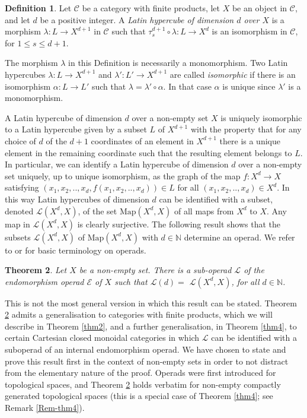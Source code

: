 \documentclass{amsart} %
\theoremstyle{plain}\newtheorem{Theorem}{Theorem}[section]
\theoremstyle{plain}\newtheorem{Conjecture}[Theorem]{Conjecture}
\theoremstyle{plain}\newtheorem{Corollary}[Theorem]{Corollary}
\theoremstyle{plain}\newtheorem{Lemma}[Theorem]{Lemma}
\theoremstyle{plain}\newtheorem{Proposition}[Theorem]{Proposition}
\theoremstyle{definition}\newtheorem{Definition}[Theorem]{Definition}
\theoremstyle{definition}\newtheorem{Example}[Theorem]{Example}
\theoremstyle{definition}\newtheorem{Examples}[Theorem]{Examples}
\theoremstyle{definition}\newtheorem{Remark}[Theorem]{Remark}
\theoremstyle{definition}\newtheorem{Remarks}[Theorem]{Remarks}
\theoremstyle{plain}\newtheorem{Statement}[Theorem]{}
\def\CC{{\mathcal{C}}}    \def\OP{{\mathcal{O}P}}
\def\CE{{\mathcal{E}}}    \def\OR{{\mathcal{O}R}}
\def\CL{{\mathcal{L}}}  \def\bCL{{\mathbf{L}}}
\def\N{{\mathbb N}}
\def\Map{\mathrm{Map}}
\begin{document}
\begin{Definition} \label{hypercubeDef}
Let $\CC$ be a category with finite products,  let $X$ be an object in $\CC$, and let $d$ be 
a positive integer.
A {\em Latin hypercube of dimension $d$ over $X$} is a morphism $\lambda : L \to X^{d+1}$
in $\CC$ such that $\tau^{d+1}_s\circ \lambda : L \to X^d$ is an isomorphism
in $\CC$, for $1\leq s\leq d+1$.
\end{Definition} 

The morphism $\lambda$ in this Definition is necessarily a monomorphism. 
Two Latin hypercubes $\lambda : L\to X^{d+1}$ and $\lambda' : L'\to X^{d+1}$ 
are called {\em isomorphic} if there is an isomorphism $\alpha : L\to L'$ such that 
$\lambda=\lambda'\circ\alpha$. In that case $\alpha$ is unique since $\lambda'$ 
is a monomorphism. 

\medskip
A Latin hypercube of  dimension $d$ over a non-empty set $X$ is uniquely 
isomorphic to a Latin hypercube given by
 a  subset $L$ of $X^{d+1}$ with the property that for any choice 
of $d$ of the $d+1$ coordinates of an element in $X^{d+1}$ there is a unique element 
in the remaining coordinate
such that the resulting element belongs to $L$. In particular, we can 
identify a Latin hypercube of dimension $d$ over a non-empty set uniquely, up to
unique isomorphism, as the graph  of the 
map $f : X^d\to X$ satisfying $(x_1,x_2,..,x_d, f(x_1,x_2,..,x_d))\in L$ for all
$(x_1,x_2,..,x_d)\in X^d$. In this way 
Latin hypercubes of dimension $d$ can be identified with a subset, denoted 
$\CL(X^d,X)$, of  the set $\Map(X^d,X)$ of all maps from $X^d$ to $X$. 
Any map in $\CL(X^d,X)$ is  clearly surjective. The following result
 shows that the subsets $\CL(X^d,X)$ of $\Map(X^d,X)$ with $d\in \N$
determine an operad. We refer to
\cite{May72} or \cite[Part II, \S 1.2]{MarShnSta}  for basic terminology on operads.


\begin{Theorem} \label{thm1}
Let $X$ be a non-empty set. There is a sub-operad $\CL$ of the endomorphism
operad $\CE$ of $X$ such that $\CL(d)=$ $\CL(X^d,X)$, for all  $d\in \N$.
\end{Theorem}

This is not the most general version in which this result can be stated.
Theorem \ref{thm1}  admits a generalisation to  categories with finite products, 
which we will describe in Theorem \ref{thm2}, and 
 a further generalisation, in Theorem \ref{thm4},  to certain Cartesian closed 
monoidal categories  in which  $\CL$ can  be identified with a 
suboperad of an internal endomorphism operad.
We have chosen to state and prove this result first in the context of non-empty 
sets in order to not distract  from the elementary nature  of the proof.
Operads were first introduced for topological spaces, and Theorem \ref{thm1} 
holds verbatim for non-empty  compactly generated topological spaces (this is
a special case of Theorem \ref{thm4}; see Remark \ref{Rem-thm4}).
\end{document}
